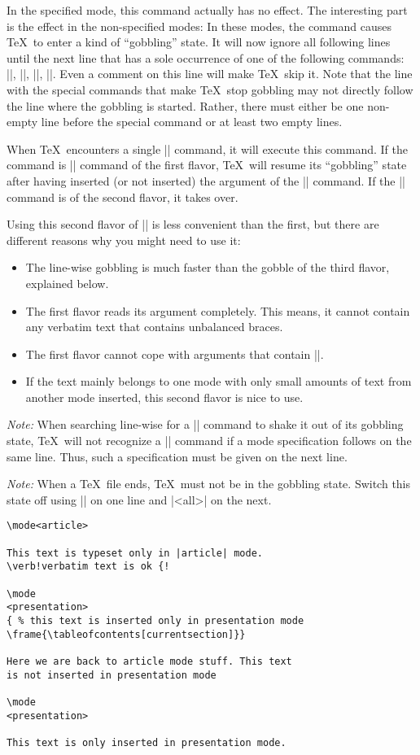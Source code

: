 \begin{command}{\mode{}}
  In the specified mode, this command actually has no effect. The interesting part is the effect in the non-specified modes: In these modes, the command causes \TeX\ to enter a kind of ``gobbling'' state. It will now ignore all following lines until the next line that has a sole occurrence of one of the following commands: |\mode|, |\mode*|, ||, ||. Even a comment on this line will make \TeX\ skip it. Note that the line with the special commands that make \TeX\ stop gobbling may not directly follow the line where the gobbling is started. Rather, there must either be one non-empty line before the special command or at least two empty lines.

  When \TeX\ encounters a single |\mode| command, it will execute this command. If the command is |\mode| command of the first flavor, \TeX\ will resume its ``gobbling'' state after having inserted (or not inserted) the argument of the |\mode| command. If the |\mode| command is of the second flavor, it takes over.

  Using this second flavor of |\mode| is less convenient than the first, but there are different reasons why you might need to use it:
  \begin{itemize}
  \item
    The line-wise gobbling is much faster than the gobble of the third flavor, explained below.
  \item
    The first flavor reads its argument completely. This means, it cannot contain any verbatim text that contains unbalanced braces.
  \item
    The first flavor cannot cope with arguments that contain ||.
  \item
    If the text mainly belongs to one mode with only small amounts of text from another mode inserted, this second flavor is nice to use.
  \end{itemize}

  \emph{Note:} When searching line-wise for a |\mode| command to shake it out of its gobbling state, \TeX\ will not recognize a |\mode| command if a mode specification follows on the same line. Thus, such a specification must be given on the next line.

  \emph{Note:} When a \TeX\ file ends, \TeX\ must not be in the gobbling state. Switch this state off using |\mode| on one line and |<all>| on the next.

  \example
\begin{verbatim}
\mode<article>

This text is typeset only in |article| mode.
\verb!verbatim text is ok {!

\mode
<presentation>
{ % this text is inserted only in presentation mode
\frame{\tableofcontents[currentsection]}}

Here we are back to article mode stuff. This text
is not inserted in presentation mode

\mode
<presentation>

This text is only inserted in presentation mode.
\end{verbatim}
\end{command}


